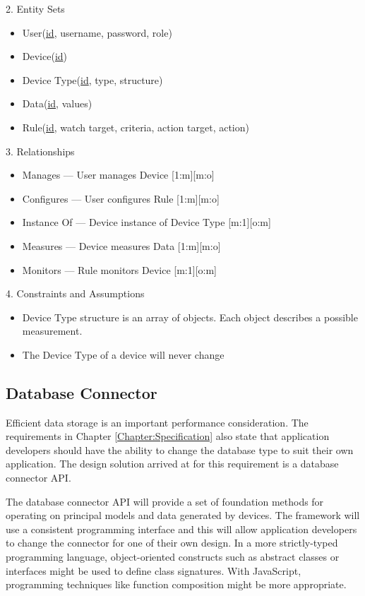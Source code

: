       2. Entity Sets
      \begin{itemize}
        \item User(\underline{id}, username, password, role)
        \item Device(\underline{id})
        \item Device Type(\underline{id}, type, structure)
        \item Data(\underline{id}, values)
        \item Rule(\underline{id}, watch target, criteria, action target, action)
      \end{itemize}

      3. Relationships
      \begin{itemize}
        \item Manages --- User manages Device [1:m][m:o]
        \item Configures --- User configures Rule [1:m][m:o]
        \item Instance Of --- Device instance of Device Type [m:1][o:m]
        \item Measures --- Device measures Data [1:m][m:o]
        \item Monitors --- Rule monitors Device [m:1][o:m]
      \end{itemize}

      4. Constraints and Assumptions
      \begin{itemize}
        \item Device Type structure is an array of objects. Each object describes a possible measurement.
        \item The Device Type of a device will never change
      \end{itemize}
    \subsection{Database Connector}
      Efficient data storage is an important performance consideration. The requirements in Chapter \ref{Chapter:Specification} also state that application developers should have the ability to change the database type to suit their own application. The design solution arrived at for this requirement is a database connector API.

      The database connector API will provide a set of foundation methods for operating on principal models and data generated by devices. The framework will use a consistent programming interface and this will allow application developers to change the connector for one of their own design. In a more strictly-typed programming language, object-oriented constructs such as abstract classes or interfaces might be used to define class signatures. With JavaScript, programming techniques like function composition might be more appropriate. 

